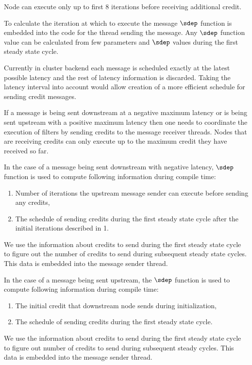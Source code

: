 Node can execute only up to first 8 iterations before receiving additional credit.

To calculate the iteration at which to execute the message $\sdep$
function is embedded into the code for the thread sending the
message. Any $\sdep$ function value can be calculated from few
parameters and $\sdep$ values during the first steady state cycle.

Currently in cluster backend each message is scheduled exactly at the 
latest possible
latency and the rest of latency information is discarded. Taking the
latency interval into account would allow creation of a more efficient
schedule for sending credit messages.

If a message is being sent downstream at a negative maximum latency 
or is being sent upstream with a positive maximum latency
then one needs to coordinate the execution of filters by sending
credits to the message receiver threads. Nodes that are receiving 
credits can only execute up to the maximum credit they have received so far.

In the case of a message being sent downstream with negative latency,
$\sdep$ function is used to compute following information during compile 
time:

\begin{enumerate}
\item Number of iterations the upstream message sender can execute before sending any credits,
\item The schedule of sending credits during the first steady state cycle after the initial iterations described in 1.
\end{enumerate}

We use the information about credits to send during the first steady state 
cycle to figure out the number of credits to send during subsequent steady
state cycles. This data is embedded into the message sender thread.

In the case of a message being sent upstream, 
the $\sdep$ function is used to compute following information during compile 
time:

\begin{enumerate}
\item The initial credit that downstream node sends during initialization,
\item The schedule of sending credits during the first steady state cycle.
\end{enumerate}

We use the information about credits to send during the first steady state 
cycle to figure out number of credits to send during subsequent steady
cycles. This data is embedded into the message sender thread.
